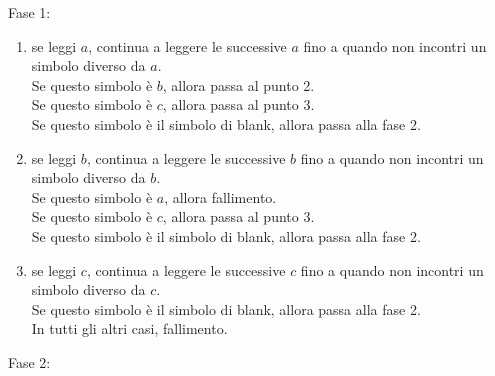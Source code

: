 Fase 1:
\begin{enumerate}
    \item se leggi $a$, continua a leggere le successive $a$
    fino a quando non incontri un simbolo diverso da $a$.\\
    Se questo simbolo è $b$, allora passa al punto 2.\\
    Se questo simbolo è $c$, allora passa al punto 3.\\
    Se questo simbolo è il simbolo di blank, allora passa alla fase 2.
    \item se leggi $b$, continua a leggere le successive $b$ fino a quando
    non incontri un simbolo diverso da $b$.\\
    Se questo simbolo è $a$, allora fallimento.\\
    Se questo simbolo è $c$, allora passa al punto 3.\\
    Se questo simbolo è il simbolo di blank, allora passa alla fase 2.
    \item se leggi $c$, continua a leggere le successive $c$ fino a quando
    non incontri un simbolo diverso da $c$.\\
    Se questo simbolo è il simbolo di blank, allora passa alla fase 2.\\
    In tutti gli altri casi, fallimento.
\end{enumerate}
Fase 2:
